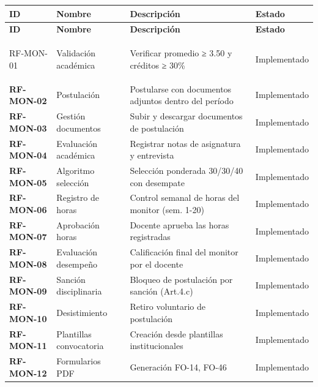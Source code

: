\documentclass[12pt,a4paper]{article}
\begin{document}
\begin{longtable}{>{\bfseries}p{2.2cm} p{4cm} p{6.5cm} p{1.5cm}}
  \toprule
  \textbf{ID} & \textbf{Nombre} & \textbf{Descripción} & \textbf{Estado} \\
  \midrule
  \endfirsthead
  \toprule \textbf{ID} & \textbf{Nombre} & \textbf{Descripción} & \textbf{Estado} \\ \midrule
  \endhead

  RF-MON-01 & Validación académica & Verificar promedio ≥ 3.50 y créditos ≥ 30\% & \textcolor{green!50!black}{Implementado} \\[3pt]
  RF-MON-02 & Postulación & Postularse con documentos adjuntos dentro del período & \textcolor{green!50!black}{Implementado} \\[3pt]
  RF-MON-03 & Gestión documentos & Subir y descargar documentos de postulación & \textcolor{green!50!black}{Implementado} \\[3pt]
  RF-MON-04 & Evaluación académica & Registrar notas de asignatura y entrevista & \textcolor{green!50!black}{Implementado} \\[3pt]
  RF-MON-05 & Algoritmo selección & Selección ponderada 30/30/40 con desempate & \textcolor{green!50!black}{Implementado} \\[3pt]
  RF-MON-06 & Registro de horas & Control semanal de horas del monitor (sem. 1-20) & \textcolor{green!50!black}{Implementado} \\[3pt]
  RF-MON-07 & Aprobación horas & Docente aprueba las horas registradas & \textcolor{green!50!black}{Implementado} \\[3pt]
  RF-MON-08 & Evaluación desempeño & Calificación final del monitor por el docente & \textcolor{green!50!black}{Implementado} \\[3pt]
  RF-MON-09 & Sanción disciplinaria & Bloqueo de postulación por sanción (Art.4.c) & \textcolor{green!50!black}{Implementado} \\[3pt]
  RF-MON-10 & Desistimiento & Retiro voluntario de postulación & \textcolor{green!50!black}{Implementado} \\[3pt]
  RF-MON-11 & Plantillas convocatoria & Creación desde plantillas institucionales & \textcolor{green!50!black}{Implementado} \\[3pt]
  RF-MON-12 & Formularios PDF & Generación FO-14, FO-46 & \textcolor{green!50!black}{Implementado} \\

  \bottomrule
\end{longtable}
\end{document}
